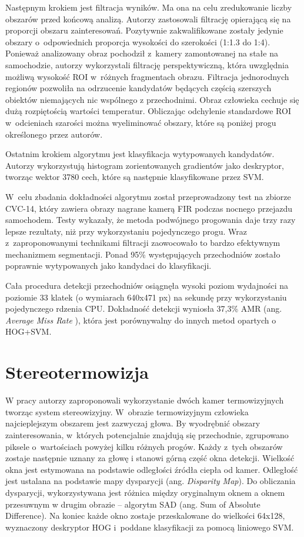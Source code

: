 Następnym krokiem jest filtracja wyników.
Ma ona na celu zredukowanie liczby obszarów przed końcową analizą.
Autorzy zastosowali filtrację opierającą się na proporcji obszaru zainteresowań.
Pozytywnie zakwalifikowane zostały jedynie obszary o~odpowiednich proporcja wysokości do szerokości (1:1.3 do 1:4).
Ponieważ analizowany obraz pochodził z~kamery zamontowanej na stałe na samochodzie, autorzy wykorzystali filtrację perspektywiczną, która uwzględnia możliwą wysokość ROI w~różnych fragmentach obrazu.
Filtracja jednorodnych regionów pozwoliła na odrzucenie kandydatów będących częścią szerszych obiektów niemających nic wspólnego z przechodnimi. 
Obraz człowieka cechuje się dużą rozpiętością wartości temperatur. 
Obliczając odchylenie standardowe ROI w~odcieniach szarości można wyeliminować obszary, które są poniżej progu określonego przez autorów. 

Ostatnim krokiem algorytmu jest klasyfikacja wytypowanych kandydatów.
Autorzy wykorzystują histogram zorientowanych gradientów jako deskryptor, tworząc wektor 3780 cech, które są następnie klasyfikowane przez SVM.

W~celu zbadania dokładności algorytmu został przeprowadzony test na zbiorze CVC-14, który zawiera obrazy nagrane kamerą FIR podczas nocnego przejazdu samochodem.
Testy wykazały, że metoda podwójnego progowania daje trzy razy lepsze rezultaty, niż przy wykorzystaniu pojedynczego progu. 
Wraz z~zaproponowanymi technikami filtracji zaowocowało to bardzo efektywnym mechanizmem segmentacji. 
Ponad 95\% występujących przechodniów zostało poprawnie wytypowanych jako kandydaci do klasyfikacji.

Cała procedura detekcji przechodniów osiągnęła wysoki poziom wydajności na poziomie 33 klatek (o wymiarach 640x471 px) na sekundę przy wykorzystaniu pojedynczego rdzenia CPU. 
Dokładność detekcji wyniosła 37,3\% AMR
(ang. \textit{ Average Miss Rate }), która jest porównywalny do innych metod opartych o HOG+SVM.

\section{Stereotermowizja}

W pracy \cite{suard2006pedestrian} autorzy zaproponowali wykorzystanie dwóch kamer termowizyjnych tworząc system stereowizyjny. 
W~obrazie termowizyjnym człowieka najcieplejszym obszarem jest zazwyczaj głowa. 
By wyodrębnić obszary zainteresowania, w~których potencjalnie znajdują się przechodnie, zgrupowano piksele o~wartościach powyżej kilku różnych progów. 
Każdy z~tych obszarów zostaje następnie uznany za głowę i stanowi górną część okna detekcji. 
Wielkość okna jest estymowana na podstawie odległości źródła ciepła od kamer. 
Odległość jest ustalana na podstawie mapy dysparycji (ang. \textit{Disparity Map}). 
Do obliczania dysparycji, wykorzystywana jest różnica między oryginalnym oknem a oknem przesuwnym w drugim obrazie -- algorytm SAD (ang. Sum of Absolute Difference). 
Na koniec każde okno zostaje przeskalowane do wielkości 64x128, wyznaczony deskryptor HOG i~poddane klasyfikacji za pomocą liniowego SVM. 

